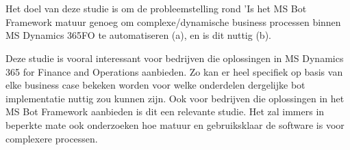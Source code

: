 
%
%

%



\chapter*{}

Het doel van deze studie is om de probleemstelling rond 'Is het MS Bot Framework matuur genoeg om complexe/dynamische business processen binnen MS Dynamics 365FO te automatiseren (a), en is dit nuttig (b).

Deze studie is vooral interessant voor bedrijven die oplossingen in MS Dynamics 365 for Finance and Operations aanbieden. Zo kan er heel specifiek op basis van elke business case bekeken worden voor welke onderdelen dergelijke bot implementatie nuttig zou kunnen zijn. Ook voor bedrijven die oplossingen in het MS Bot Framework aanbieden is dit een relevante studie. Het zal immers in beperkte mate ook onderzoeken hoe matuur en gebruiksklaar de software is voor complexere processen.
 

